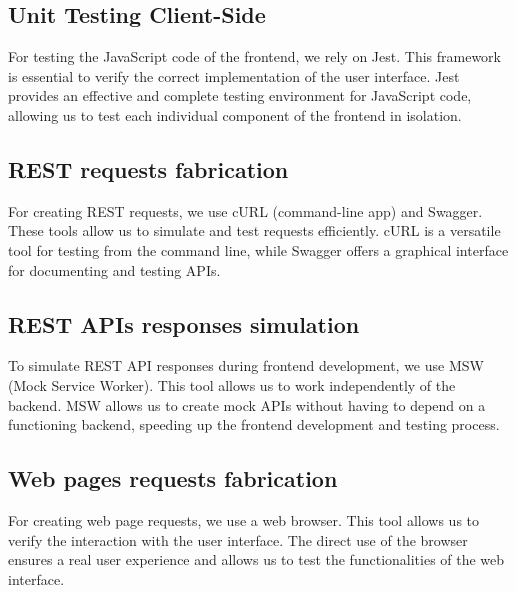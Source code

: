 \subsection{Unit Testing Client-Side}
For testing the JavaScript code of the frontend, we rely on Jest. This framework is 
essential to verify the correct implementation of the user interface.
Jest provides an effective and complete testing environment for JavaScript code, 
allowing us to test each individual component of the frontend in isolation.

\subsection{REST requests fabrication}
For creating REST requests, we use cURL (command-line app) and Swagger. These tools 
allow us to simulate and test requests efficiently.
cURL is a versatile tool for testing from the command line, while Swagger offers a 
graphical interface for documenting and testing APIs.

\subsection{REST APIs responses simulation}
To simulate REST API responses during frontend development, we use MSW (Mock Service Worker). 
This tool allows us to work independently of the backend.
MSW allows us to create mock APIs without having to depend on a functioning backend, 
speeding up the frontend development and testing process.

\subsection{Web pages requests fabrication}
For creating web page requests, we use a web browser. This tool allows us to verify 
the interaction with the user interface.
The direct use of the browser ensures a real user experience and allows us to test 
the functionalities of the web interface.








